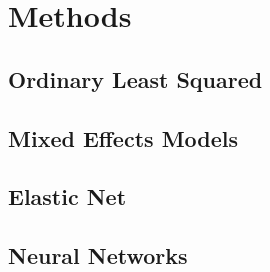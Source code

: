 \chapter{Methods}

\section{Ordinary Least Squared}

\section{Mixed Effects Models}

\section{Elastic Net}

\section{Neural Networks}
